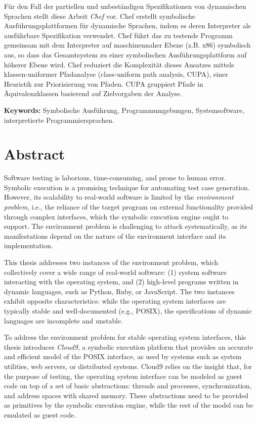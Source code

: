 \documentclass[letterpaper,10pt,oneside]{book}
\newcommand{\cnine}{Cloud9\xspace}
\newcommand{\chef}{Chef\xspace}
\begin{document}
Für den Fall der partiellen und unbeständigen Spezifikationen von dynamischen Sprachen stellt diese Arbeit \emph{\chef} vor. \chef erstellt symbolische Ausführungsplattformen für dynamische Sprachen, indem es deren Interpreter als ausführbare Spezifikation verwendet. \chef führt das zu testende Programm gemeinsam mit dem Interpreter auf maschinennaher Ebene (z.B. x86) symbolisch aus, so dass das Gesamtsystem zu einer symbolischen Ausführungsplattform auf höherer Ebene wird. \chef reduziert die Komplexität dieses Ansatzes mittels klassen-uniformer Pfadanalyse (class-uniform path analysis, CUPA), einer Heuristik zur Priorisierung von Pfaden. CUPA gruppiert Pfade in Äquivalenzklassen basierend auf Zielvorgaben der Analyse. 

\noindent \textbf{Keywords:} Symbolische Ausführung, Programmumgebungen, Systemsoftware, interpretierte Programmiersprachen.

\chapter*{Abstract}

Software testing is laborious, time-consuming, and prone to human error.  Symbolic execution is a promising technique for automating test case generation.  However, its scalability to real-world software is limited by the \emph{environment problem}, i.e., the reliance of the target program on external functionality provided through complex interfaces, which the symbolic execution engine ought to support.
%
The environment problem is challenging to attack systematically, as its manifestations depend on the nature of the environment interface and its implementation.

This thesis addresses two instances of the environment problem, which collectively cover a wide range of real-world software: (1) system software interacting with the operating system, and (2) high-level programs written in dynamic languages, such as Python, Ruby, or JavaScript.  The two instances exhibit opposite characteristics: while the operating system interfaces are typically stable and well-documented (e.g., POSIX), the specifications of dynamic languages are incomplete and unstable.

To address the environment problem for stable operating system interfaces, this thesis introduces \emph{\cnine}, a symbolic execution platform that provides an accurate and efficient model of the POSIX interface, as used by systems such as system utilities, web servers, or distributed systems.
%
\cnine relies on the insight that, for the purpose of testing, the operating system interface can be modeled as guest code on top of a set of basic abstractions: threads and processes, synchronization, and address spaces with shared memory. These abstractions need to be provided as primitives by the symbolic execution engine, while the rest of the model can be emulated as guest code.
\end{document}
